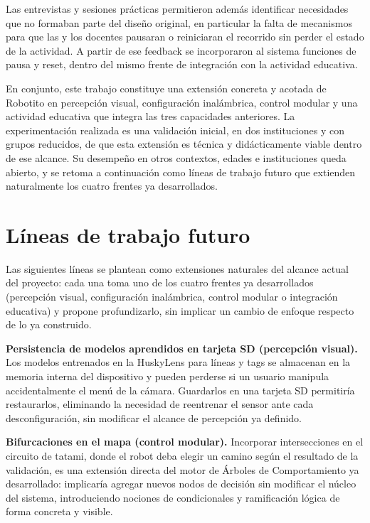 \documentclass{prgrado}
\begin{document}
Las entrevistas y sesiones prácticas permitieron además identificar necesidades que no formaban parte del diseño original, en particular la falta de mecanismos para que las y los docentes pausaran o reiniciaran el recorrido sin perder el estado de la actividad. A partir de ese feedback se incorporaron al sistema funciones de pausa y reset, dentro del mismo frente de integración con la actividad educativa.

En conjunto, este trabajo constituye una extensión concreta y acotada de Robotito en percepción visual, configuración inalámbrica, control modular y una actividad educativa que integra las tres capacidades anteriores. La experimentación realizada es una validación inicial, en dos instituciones y con grupos reducidos, de que esta extensión es técnica y didácticamente viable dentro de ese alcance. Su desempeño en otros contextos, edades e instituciones queda abierto, y se retoma a continuación como líneas de trabajo futuro que extienden naturalmente los cuatro frentes ya desarrollados.

\section{Líneas de trabajo futuro}

Las siguientes líneas se plantean como extensiones naturales del alcance actual del proyecto: cada una toma uno de los cuatro frentes ya desarrollados (percepción visual, configuración inalámbrica, control modular o integración educativa) y propone profundizarlo, sin implicar un cambio de enfoque respecto de lo ya construido.

\textbf{Persistencia de modelos aprendidos en tarjeta SD (percepción visual).} Los modelos entrenados en la HuskyLens para líneas y tags se almacenan en la memoria interna del dispositivo y pueden perderse si un usuario manipula accidentalmente el menú de la cámara. Guardarlos en una tarjeta SD permitiría restaurarlos, eliminando la necesidad de reentrenar el sensor ante cada desconfiguración, sin modificar el alcance de percepción ya definido.


\textbf{Bifurcaciones en el mapa (control modular).} Incorporar intersecciones en el circuito de tatami, donde el robot deba elegir un camino según el resultado de la validación, es una extensión directa del motor de Árboles de Comportamiento ya desarrollado: implicaría agregar nuevos nodos de decisión sin modificar el núcleo del sistema, introduciendo nociones de condicionales y ramificación lógica de forma concreta y visible.
\end{document}
